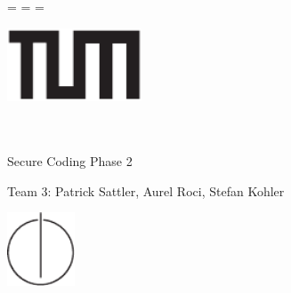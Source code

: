 \begin{titlepage}
  \oddsidemargin=\evensidemargin\relax
  \textwidth=\dimexpr{}\evensidemargin-2in\relax
  \hsize=\textwidth\relax

  \centering

  \includegraphics[width=40mm]{logos/tum}

  \vspace{5mm}
  {\huge\MakeUppercase{\getFaculty{}}}\\

  \vspace{5mm}
  {\large\MakeUppercase{\getUniversity{}}}\\

  \vspace{20mm}
  {\Large Secure Coding Phase 2}

  \vspace{15mm}

  \vspace{15mm}
  {\LARGE Team 3:
  	 Patrick Sattler, Aurel Roci, Stefan Kohler}

  \vspace{20mm}
  \includegraphics[width=20mm]{logos/faculty}
\end{titlepage}
